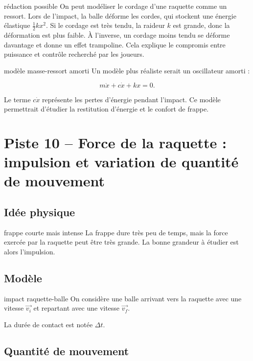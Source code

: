 \documentclass[11pt,a4paper]{article}
\begin{document}
\begin{oral}{rédaction possible}
On peut modéliser le cordage d'une raquette comme un ressort. Lors de l'impact, la balle déforme les cordes, qui stockent une énergie élastique $\frac12kx^2$. Si le cordage est très tendu, la raideur $k$ est grande, donc la déformation est plus faible. À l'inverse, un cordage moins tendu se déforme davantage et donne un effet trampoline. Cela explique le compromis entre puissance et contrôle recherché par les joueurs.
\end{oral}

\begin{prepa}{modèle masse-ressort amorti}
Un modèle plus réaliste serait un oscillateur amorti :

\[
m\ddot{x}+c\dot{x}+kx=0.
\]

Le terme $c\dot{x}$ représente les pertes d'énergie pendant l'impact. Ce modèle permettrait d'étudier la restitution d'énergie et le confort de frappe.
\end{prepa}

\section{Piste 10 -- Force de la raquette : impulsion et variation de quantité de mouvement}

\subsection{Idée physique}

\begin{idee}{frappe courte mais intense}
La frappe dure très peu de temps, mais la force exercée par la raquette peut être très grande. La bonne grandeur à étudier est alors l'impulsion.
\end{idee}

\subsection{Modèle}

\begin{modele}{impact raquette-balle}
On considère une balle arrivant vers la raquette avec une vitesse $\vec{v_i}$ et repartant avec une vitesse $\vec{v_f}$.

La durée de contact est notée $\Delta t$.
\end{modele}

\subsection{Quantité de mouvement}
\end{document}
